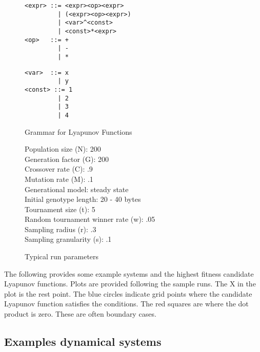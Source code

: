 \documentclass[12pt]{article}
\begin{document}
\begin{figure}[tbh]
{\color{blue}
\hspace*{0.15\textwidth}
\begin{minipage}{0.41\textwidth}
{\footnotesize
\begin{verbatim}
<expr> ::= <expr><op><expr>
         | (<expr><op><expr>)
         | <var>^<const>
         | <const>*<expr>
<op>   ::= +
         | -
         | *
\end{verbatim}
}
\end{minipage}
\hspace*{0.05\textwidth}
\begin{minipage}{0.3\textwidth}
{\footnotesize
\begin{verbatim}
<var>  ::= x
         | y
<const> ::= 1
         | 2
         | 3
         | 4
\end{verbatim}
}
\end{minipage}
}
\caption{\label{minigrammar} Grammar for Lyapunov Functions}
\end{figure}

\begin{figure}[tbh]
{\footnotesize
Population size (N): 200\\
Generation factor (G): 200\\
Crossover rate (C): .9\\
Mutation rate (M): .1\\
Generational model: steady state\\
Initial genotype length: 20 - 40 bytes\\
Tournament size (t): 5\\
Random tournament winner rate (w): .05\\
Sampling radius (r):  .3\\
Sampling granularity (s): .1
}
\caption{Typical run parameters\label{parameters}}
\end{figure}

The following provides some example systems and the highest fitness
candidate Lyapunov functions.  Plots are provided following the sample
runs.  The X in the plot is the rest point.  The blue circles indicate
grid points where the candidate Lyapunov function  satisfies the
conditions.  The red squares are where the dot product
is zero.  These are often boundary cases.

\subsection{Examples dynamical systems}
\end{document}
